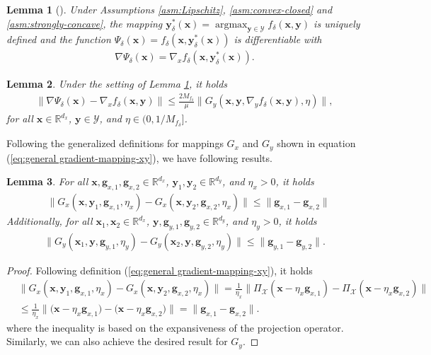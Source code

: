 \documentclass[11pt]{article}
\def\vg{\mathbf{g}}
\def\vx{\mathbf{x}}
\def\vy{\mathbf{y}}
\def\fY{{\mathcal{Y}}}
\def\BR{{\mathbb{R}}}
\DeclareMathOperator*{\argmax}{argmax}
\newtheorem{lemma}{Lemma}
\begin{document}
\begin{lemma}[{\citet[Theorem A.22]{bertsekas1971control}}]\label{danskin}
Under Assumptions \ref{asm:Lipschitz}, \ref{asm:convex-closed} and \ref{asm:strongly-concave}, 
the mapping $\vy_\delta^*(\vx) = \argmax_{\vy\in\fY} f_\delta(\vx,\vy)$ is uniquely defined
and the function $\Psi_\delta(\vx) = f_\delta(\vx,\vy_\delta^*(\vx))$ is differentiable with 
\begin{align*}
    \nabla \Psi_\delta(\vx)=\nabla_x f_\delta(\vx,\vy_\delta^*(\vx)).
\end{align*}
\end{lemma}


\begin{lemma}\label{lemma: A1}
Under the setting of Lemma \ref{danskin}, it holds 
\begin{align*}
\| \nabla \Psi_\delta(\vx) - \nabla_x f_\delta(\vx, \vy) \| \leq \frac{2M_{f_\delta}}{\mu} \| G_y(\vx, \vy,\nabla_y f_\delta(\vx,\vy),\eta) \|,   
\end{align*}
for all $\vx\in\BR^{d_x}$, $\vy\in\fY$, and $\eta\in(0, 1/M_{f_\delta}]$.
\end{lemma}

Following the generalized definitions for mappings $G_x$ and $G_y$ shown in equation (\ref{eq:general gradient-mapping-xy}), we have following results.


\begin{lemma}\label{lemma: g&G_1}
For all $\vx,\vg_{x,1},\vg_{x,2}\in \mathbb{R}^{d_x}$, $\vy_1,\vy_2\in\BR^{d_y}$, and $\eta_x>0$, it holds
\begin{align*}
&\| G_x(\vx,\vy_1, \vg_{x,1}, \eta_x) - G_x(\vx,\vy_2, \vg_{x,2}, \eta_x) \| \leq\|\vg_{x,1}-\vg_{x,2}\|
\end{align*}
Additionally, for all $\vx_1,\vx_2\in\BR^{d_x}$, $\vy,\vg_{y,1},\vg_{y,2}\in \mathbb{R}^{d_y}$, and $\eta_y>0$, it holds
\begin{align*}
 \| G_y(\vx_1,\vy, \vg_{y,1}, \eta_y) - G_y(\vx_2,\vy, \vg_{y,2}, \eta_y) \| \leq \|\vg_{y,1}-\vg_{y,2}\|.
\end{align*}
\end{lemma}

\begin{proof}
Following definition  (\ref{eq:general gradient-mapping-xy}), it holds
\[
\begin{aligned}
& \bigl\|G_x(\vx,\vy_1,\vg_{x,1},\eta_x)-G_x(\vx,\vy_2,\vg_{x,2},\eta_x)\bigr\|
= \frac{1}{\eta_x}\bigl\|\Pi_{\mathcal{X}}(\vx-\eta_x\vg_{x,1})-\Pi_{\mathcal{X}}(\vx-\eta_x\vg_{x,2})\bigr\|  \\
&\le \frac{1}{\eta_x}\big\|\bigl(\vx-\eta_x\vg_{x,1}\bigr)-\bigl(\vx-\eta_x \vg_{x,2}\bigr)\big\| 
= \|\vg_{x,1}-\vg_{x,2}\|.
\end{aligned}
\]
where the inequality is based on the expansiveness of the projection operator. Similarly, we can also achieve the desired result for $G_y$.
\end{proof}
\end{document}

